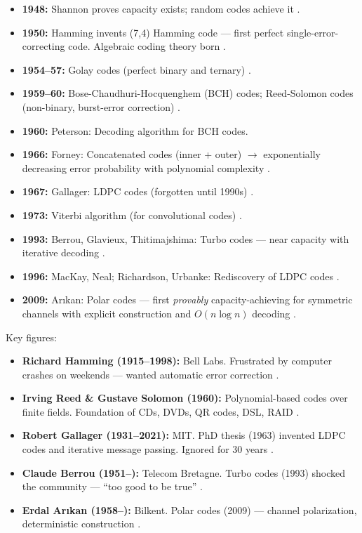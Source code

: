 \begin{itemize}
\item \textbf{1948:} Shannon proves capacity exists; random codes achieve it \cite{Shannon1948}.
\item \textbf{1950:} Hamming invents (7,4) Hamming code --- first perfect single-error-correcting code. Algebraic coding theory born \cite{Hamming1950}.
\item \textbf{1954--57:} Golay codes (perfect binary and ternary) \cite{Golay1949}.
\item \textbf{1959--60:} Bose-Chaudhuri-Hocquenghem (BCH) codes; Reed-Solomon codes (non-binary, burst-error correction) \cite{ReedSolomon1960}.
\item \textbf{1960:} Peterson: Decoding algorithm for BCH codes.
\item \textbf{1966:} Forney: Concatenated codes (inner + outer) $\to$ exponentially decreasing error probability with polynomial complexity \cite{Forney1966}.
\item \textbf{1967:} Gallager: LDPC codes (forgotten until 1990s) \cite{Gallager1963}.
\item \textbf{1973:} Viterbi algorithm (for convolutional codes) \cite{Viterbi1967}.
\item \textbf{1993:} Berrou, Glavieux, Thitimajshima: Turbo codes --- near capacity with iterative decoding \cite{Berrou1993}.
\item \textbf{1996:} MacKay, Neal; Richardson, Urbanke: Rediscovery of LDPC codes \cite{gallager1968}.
\item \textbf{2009:} Ar{\i}kan: Polar codes --- first \emph{provably} capacity-achieving for symmetric channels with explicit construction and $O(n \log n)$ decoding \cite{Arikan2009}.
\end{itemize}

Key figures:
\begin{itemize}
\item \textbf{Richard Hamming (1915--1998):} Bell Labs. Frustrated by computer crashes on weekends --- wanted automatic error correction \cite{Hamming1950}.
\item \textbf{Irving Reed \& Gustave Solomon (1960):} Polynomial-based codes over finite fields. Foundation of CDs, DVDs, QR codes, DSL, RAID \cite{ReedSolomon1960}.
\item \textbf{Robert Gallager (1931--2021):} MIT. PhD thesis (1963) invented LDPC codes and iterative message passing. Ignored for 30 years \cite{Gallager1963,gallager1968}.
\item \textbf{Claude Berrou (1951--):} Telecom Bretagne. Turbo codes (1993) shocked the community --- ``too good to be true'' \cite{Berrou1993}.
\item \textbf{Erdal Ar{\i}kan (1958--):} Bilkent. Polar codes (2009) --- channel polarization, deterministic construction \cite{Arikan2009}.
\end{itemize}

